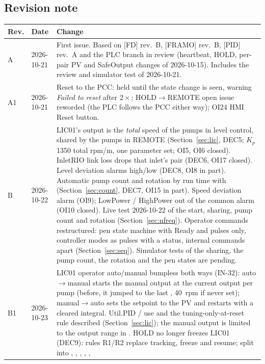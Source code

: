 \documentclass[11pt,a4paper]{article}
\begin{document}
\subsection{Revision note}
\begin{small}
\begin{tabularx}{\textwidth}{@{}P{10mm}P{22mm}L@{}}
\toprule
Rev. & Date & Change \\
\midrule
A & 2026-10-21 & First issue. Based on [FD] rev.~B, [FRAMO] rev.~B, [PID] rev.~A and the PLC branch in
  review (heartbeat, HOLD, per-pair PV and SafeOutput changes of 2026-10-15). Includes the review and
  simulator test of 2026-10-21. \\
A1 & 2026-10-21 & Reset to the PCC: held until the state change is seen, warning \emph{Failed to reset}
  after $2\times$; HOLD$\to$REMOTE open issue reworded (the PLC follows the
  PCC either way); OI24 HMI Reset button. \\
B & 2026-10-22 & LIC01's output is the \emph{total} speed of the pumps in level control, shared by the pumps
  in REMOTE (Section~\ref{sec:lic}, DEC5; $K_p$ 1350 total rpm/m, one parameter set; OI5, OI6 closed).
  InletRIO link loss drops that inlet's pair (DEC6, OI17 closed). Level deviation alarms high/low (DEC8,
  OI8 in part). Automatic pump count and rotation by run time with 
  (Section~\ref{sec:count}, DEC7, OI15 in part). Speed deviation alarm (OI9); LowPower / HighPower out of the
  common alarm (OI10 closed). Live test 2026-10-22 of the start, sharing, pump count and rotation
  (Section~\ref{sec:nfreq}). Operator commands restructured: pen state machine with Ready and pulses
  only, controller modes as pulses with a status, internal commands apart (Section~\ref{sec:seq}). Simulator
  tests of the sharing, the pump count, the rotation and the pen states are pending. \\
B1 & 2026-10-23 & LIC01 operator auto/manual bumpless both ways (IN-32): auto$\to$manual starts the manual
  output at the current output per pump (before, it jumped to the last , 40~rpm if
  never set); manual$\to$auto sets the setpoint to the PV and restarts with a cleared integral. Util.PID
   /  use and the tuning-only-at-reset rule described (Section~\ref{sec:lic});
  the manual output is limited to the output range in . HOLD no longer freezes LIC01
  (DEC9): rules R1/R2 replace tracking, freeze and resume;  split into
  , , , , ,

\end{tabularx}
\end{small}
\end{document}
